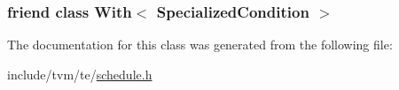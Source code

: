 \subsubsection[{\texorpdfstring{With$<$ Specialized\+Condition $>$}{With< SpecializedCondition >}}]{\setlength{\rightskip}{0pt plus 5cm}friend class {\bf With}$<$ {\bf Specialized\+Condition} $>$\hspace{0.3cm}{\ttfamily [friend]}}\hypertarget{classtvm_1_1te_1_1SpecializedCondition_ae2aff9f2ce7debae1cb1648450f6b3fe}{}\label{classtvm_1_1te_1_1SpecializedCondition_ae2aff9f2ce7debae1cb1648450f6b3fe}


The documentation for this class was generated from the following file\+:\begin{DoxyCompactItemize}
\item 
include/tvm/te/\hyperlink{schedule_8h}{schedule.\+h}\end{DoxyCompactItemize}
